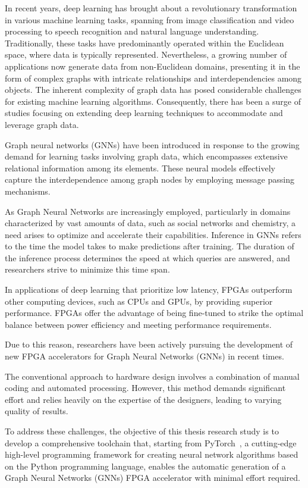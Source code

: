 \documentclass{Configuration_Files/PoliMi3i_thesis}
\begin{document}
    In recent years, deep learning has brought about a revolutionary transformation in various machine learning tasks,
    spanning from image classification and video processing to speech recognition and natural language understanding.
    Traditionally, these tasks have predominantly operated within the Euclidean space, where data is typically
    represented.
    Nevertheless, a growing number of applications now generate data from non-Euclidean domains,
    presenting it in the form of complex graphs with intricate relationships and interdependencies among objects.
    The inherent complexity of graph data has posed considerable challenges for existing machine learning algorithms.
    Consequently, there has been a surge of studies focusing on extending deep learning techniques to accommodate
    and leverage graph data.

    Graph neural networks (GNNs) have been introduced in response to the growing demand for learning tasks involving
    graph data, which encompasses extensive relational information among its elements.
    These neural models effectively capture the interdependence among graph nodes by employing message passing mechanisms.

    As Graph Neural Networks are increasingly employed, particularly in domains characterized by vast amounts of data,
    such as social networks and chemistry, a need arises to optimize and accelerate their capabilities.
    Inference in GNNs refers to the time the model takes to make predictions after training.
    The duration of the inference process determines the speed at which queries are answered, and researchers strive to minimize this time span.

    In applications of deep learning that prioritize low latency, FPGAs outperform other computing devices, such as CPUs and GPUs,
    by providing superior performance.
    FPGAs offer the advantage of being fine-tuned to strike the optimal balance between power efficiency and meeting performance requirements.

    Due to this reason, researchers have been actively pursuing the development of new FPGA accelerators for Graph Neural Networks (GNNs) in recent times.

    The conventional approach to hardware design involves a combination of manual coding and automated processing.
    However, this method demands significant effort and relies heavily on the expertise of the designers, leading to varying quality of results.

    To address these challenges, the objective of this thesis research study is to develop a comprehensive toolchain that, starting from PyTorch~\cite{DBLP:journals/corr/abs-1912-01703},
    a cutting-edge high-level programming framework for creating neural network algorithms based on the Python programming language, enables the
    automatic generation of a Graph Neural Networks (GNNs) FPGA accelerator with minimal effort required.
\end{document}

